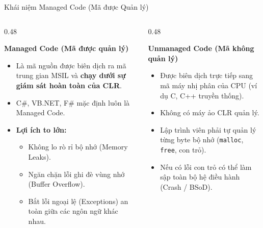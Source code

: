 \documentclass[aspectratio=169, 10pt]{beamer}
\begin{document}
\begin{frame}{Khái niệm Managed Code (Mã được Quản lý)}
  \begin{columns}[T]
    \begin{column}{0.48\textwidth}
      \begin{block}{\textbf{Managed Code (Mã được quản lý)}}
        \begin{itemize}
          \item Là mã nguồn được biên dịch ra mã trung gian MSIL và \textbf{chạy dưới sự giám sát hoàn toàn của CLR}.
          \item C\#, VB.NET, F\# mặc định luôn là Managed Code.
          \item \textbf{Lợi ích to lớn:}
          \begin{itemize}
            \item Không lo rò rỉ bộ nhớ (Memory Leaks).
            \item Ngăn chặn lỗi ghi đè vùng nhớ (Buffer Overflow).
            \item Bắt lỗi ngoại lệ (Exceptions) an toàn giữa các ngôn ngữ khác nhau.
          \end{itemize}
        \end{itemize}
      \end{block}
    \end{column}
    \begin{column}{0.48\textwidth}
      \begin{block}{\textbf{Unmanaged Code (Mã không quản lý)}}
        \begin{itemize}
          \item Được biên dịch trực tiếp sang mã máy nhị phân của CPU (ví dụ C, C++ truyền thống).
          \item Không có máy ảo CLR quản lý.
          \item Lập trình viên phải tự quản lý từng byte bộ nhớ (\texttt{malloc}, \texttt{free}, con trỏ).
          \item Nếu có lỗi con trỏ có thể làm sập toàn bộ hệ điều hành (Crash / BSoD).
        \end{itemize}
      \end{block}
    \end{column}
  \end{columns}
\end{frame}
\end{document}
